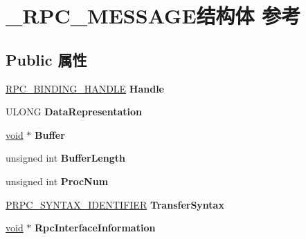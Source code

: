 \hypertarget{struct___r_p_c___m_e_s_s_a_g_e}{}\section{\+\_\+\+R\+P\+C\+\_\+\+M\+E\+S\+S\+A\+G\+E结构体 参考}
\label{struct___r_p_c___m_e_s_s_a_g_e}
\subsection*{Public 属性}
\begin{DoxyCompactItemize}
\item 
\mbox{\label{struct___r_p_c___m_e_s_s_a_g_e_ae1166de9e3416b58619244401a618532}} 
\hyperlink{interfacevoid}{R\+P\+C\+\_\+\+B\+I\+N\+D\+I\+N\+G\+\_\+\+H\+A\+N\+D\+LE} {\bfseries Handle}
\item 
\mbox{\label{struct___r_p_c___m_e_s_s_a_g_e_ad462ad91ea44349ee4d6fa99907dc66d}} 
U\+L\+O\+NG {\bfseries Data\+Representation}
\item 
\mbox{\label{struct___r_p_c___m_e_s_s_a_g_e_ab571bbb17b604b1014ee2a68f595a5f0}} 
\hyperlink{interfacevoid}{void} $\ast$ {\bfseries Buffer}
\item 
\mbox{\label{struct___r_p_c___m_e_s_s_a_g_e_a183ce60ee1a28b6062d4e1c25a910680}} 
unsigned int {\bfseries Buffer\+Length}
\item 
\mbox{\label{struct___r_p_c___m_e_s_s_a_g_e_a620a31512f5b72cf4419db58b4ce7800}} 
unsigned int {\bfseries Proc\+Num}
\item 
\mbox{\label{struct___r_p_c___m_e_s_s_a_g_e_a694972597fe2a9502107312e3b421a32}} 
\hyperlink{struct___r_p_c___s_y_n_t_a_x___i_d_e_n_t_i_f_i_e_r}{P\+R\+P\+C\+\_\+\+S\+Y\+N\+T\+A\+X\+\_\+\+I\+D\+E\+N\+T\+I\+F\+I\+ER} {\bfseries Transfer\+Syntax}
\item 
\mbox{\label{struct___r_p_c___m_e_s_s_a_g_e_a9c973bcd69d39f8199f6fc22aa776a9e}} 
\hyperlink{interfacevoid}{void} $\ast$ {\bfseries Rpc\+Interface\+Information}

\end{DoxyCompactItemize}
